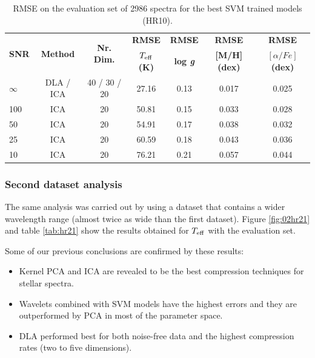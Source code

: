 \documentclass[a4paper,fleqn,usenatbib]{mnras}
\begin{document}
{{{\begin{table}
\centering
\caption{RMSE on the evaluation set of 2986 spectra for the best SVM trained models (HR10).}
\label{tab:01}
\begin{tabular}{l c c c c c c}
\hline
\multirow{2}{*}{\textbf{SNR}} & \multirow{2}{*}{\textbf{Method}} & \multirow{2}{*}{\textbf{Nr. Dim.}} & {\bf RMSE} & {\bf RMSE} & {\bf RMSE} & {\bf RMSE}\\
 &  &  & \textbf{$T_{\rm eff}$ (K)} & \textbf{log \textit{g}} & \textbf{[M/H] (dex)}  & \textbf{$\left[ \alpha/Fe \right]$ (dex)}\\
\hline
$\infty$ & DLA / ICA\protect\footnotemark[1] & 40 / 30 / 20\protect\footnotemark[2] & 27.16 & 0.13 & 0.017 & 0.025\\
100 & ICA & 20 & 50.81 & 0.15 & 0.033 & 0.028\\
50 & ICA & 20 & 54.91 & 0.17 & 0.038 & 0.032\\
25 & ICA & 20 & 60.59 & 0.18 & 0.043 & 0.036\\
10 & ICA & 20 & 76.21 & 0.21 & 0.057 & 0.044\\
\hline
\end{tabular}
\end{table}

\subsubsection{Second dataset analysis}
The same analysis was carried out by using a dataset that contains 
a wider wavelength range (almost twice as wide than the first dataset). 
Figure \ref{fig:02hr21} and table \ref{tab:hr21} show the results 
obtained for $T_{\rm eff}$ with the evaluation set.

Some of our previous conclusions are confirmed by these results:
\begin{itemize}
\item Kernel PCA and ICA are revealed to be the best compression 
	techniques for stellar spectra.  
\item Wavelets combined with SVM models have the highest errors and 
	they are outperformed by PCA in most of the parameter space.  
\item DLA performed best for both noise-free data and the highest 
	compression rates (two to five dimensions).
\end{itemize}

}}}
\end{document}
